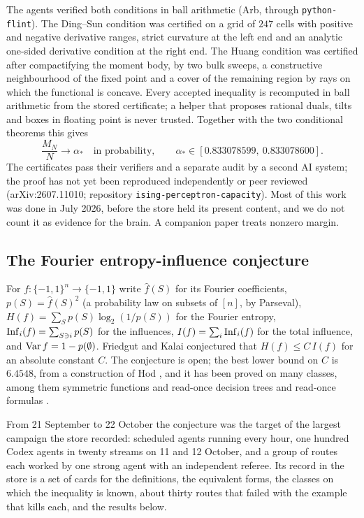 The agents verified both conditions in ball arithmetic (Arb, through \texttt{python-flint}). The Ding--Sun condition was certified on a grid of $247$ cells with positive and negative derivative ranges, strict curvature at the left end and an analytic one-sided derivative condition at the right end. The Huang condition was certified after compactifying the moment body, by two bulk sweeps, a constructive neighbourhood of the fixed point and a cover of the remaining region by rays on which the functional is concave. Every accepted inequality is recomputed in ball arithmetic from the stored certificate; a helper that proposes rational duals, tilts and boxes in floating point is never trusted. Together with the two conditional theorems this gives
\[
\frac{M_N}{N}\to\alpha_*\quad\text{in probability},\qquad \alpha_*\in[0.833078599,\ 0.833078600].
\]
The certificates pass their verifiers and a separate audit by a second AI system; the proof has not yet been reproduced independently or peer reviewed (arXiv:2607.11010; repository \texttt{ising-perceptron-capacity}). Most of this work was done in July 2026, before the store held its present content, and we do not count it as evidence for the brain. A companion paper treats nonzero margin.

\subsection{The Fourier entropy-influence conjecture}\label{subsec:fei}
For $f:\{-1,1\}^n\to\{-1,1\}$ write $\hat f(S)$ for its Fourier coefficients, $p(S)=\hat f(S)^2$ (a probability law on subsets of $[n]$, by Parseval), $H(f)=\sum_S p(S)\log_2(1/p(S))$ for the Fourier entropy, $\operatorname{Inf}_i(f)=\sum_{S\ni i}p(S)$ for the influences, $I(f)=\sum_i\operatorname{Inf}_i(f)$ for the total influence, and $\operatorname{Var} f=1-p(\emptyset)$. Friedgut and Kalai \cite{FriedgutKalai1996} conjectured that $H(f)\le C\,I(f)$ for an absolute constant $C$. The conjecture is open; the best lower bound on $C$ is $6.4548$, from a construction of Hod \cite{Hod2017}, and it has been proved on many classes, among them symmetric functions and read-once decision trees \cite{OWZ2011} and read-once formulas \cite{OT2013}.

From 21 September to 22 October the conjecture was the target of the largest campaign the store recorded: scheduled agents running every hour, one hundred Codex agents in twenty streams on 11 and 12 October, and a group of routes each worked by one strong agent with an independent referee. Its record in the store is a set of cards for the definitions, the equivalent forms, the classes on which the inequality is known, about thirty routes that failed with the example that kills each, and the results below.

